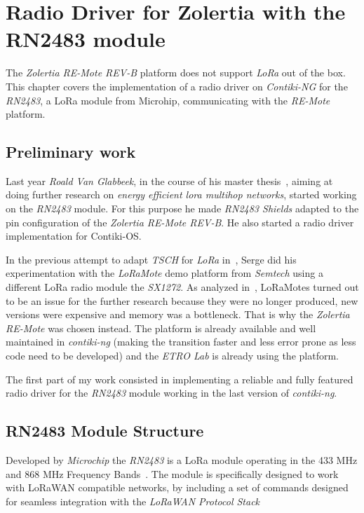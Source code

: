 \chapter{Radio Driver for Zolertia with the RN2483 module\label{section:radio}}


The \emph{Zolertia RE-Mote REV-B} platform does not support \emph{LoRa} out of
the box. This chapter covers the implementation of a radio driver on
\emph{Contiki-NG} for the \emph{RN2483}, a LoRa module from Microhip,
communicating with the \emph{RE-Mote} platform.

\section{Preliminary work}

Last year \emph{Roald Van Glabbeek}, in the course of his master thesis~\cite{8847137}, 
aiming at doing further research on \emph{energy efficient lora multihop networks}, 
started working on the \emph{RN2483} module.
For this purpose he made \emph{RN2483 Shields} adapted to the pin
configuration of the \emph{Zolertia RE-Mote REV-B}. He also started a radio driver
implementation for Contiki-OS\@.

In the previous attempt to adapt \emph{TSCH} for \emph{LoRa}
in~\cite{njomgang_2018}, Serge did his experimentation with the \emph{LoRaMote}
demo platform from \emph{Semtech} using a different LoRa radio module the
\emph{SX1272}. 
As analyzed in~\cite{8847137}, LoRaMotes turned out to be an issue for the
further research because they were no longer produced, 
new versions were expensive and memory was a bottleneck.
That is why the \emph{Zolertia RE-Mote} was chosen instead. 
The platform is already available 
and well maintained in \emph{contiki-ng} (making the transition faster and less
error prone as less code need to be developed) and the \emph{ETRO Lab} is
already using the platform.

The first part of my work consisted in implementing a reliable
and fully featured radio driver for the \emph{RN2483} module working in the last
version of \emph{contiki-ng}.

\section{RN2483 Module Structure}

Developed by \emph{Microchip} the \emph{RN2483} is a LoRa module operating in
the 433 MHz and 868 MHz Frequency Bands~\cite{microchip:rn2483}. 
The module is specifically designed to work with LoRaWAN compatible networks, 
by including a set of commands designed for seamless integration with the
\emph{LoRaWAN Protocol Stack}

